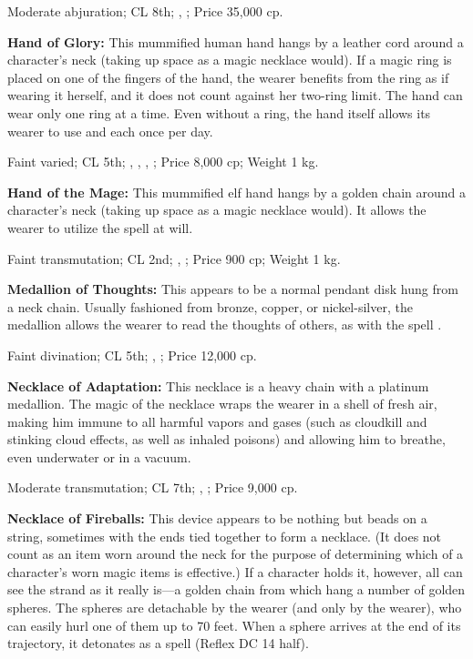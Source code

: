 Moderate abjuration; CL 8th; , ; Price 35,000 cp.


\textbf{Hand of Glory:} This mummified human hand hangs by a leather cord around a character's neck (taking up space as a magic necklace would). If a magic ring is placed on one of the fingers of the hand, the wearer benefits from the ring as if wearing it herself, and it does not count against her two-ring limit. The hand can wear only one ring at a time. Even without a ring, the hand itself allows its wearer to use  and  each once per day.

Faint varied; CL 5th; , , , ; Price 8,000 cp; Weight 1 kg.


\textbf{Hand of the Mage:} This mummified elf hand hangs by a golden chain around a character's neck (taking up space as a magic necklace would). It allows the wearer to utilize the spell  at will.

Faint transmutation; CL 2nd; , ; Price 900 cp; Weight 1 kg.


\textbf{Medallion of Thoughts:} This appears to be a normal pendant disk hung from a neck chain. Usually fashioned from bronze, copper, or nickel-silver, the medallion allows the wearer to read the thoughts of others, as with the spell .

Faint divination; CL 5th; , ; Price 12,000 cp.


\textbf{Necklace of Adaptation:} This necklace is a heavy chain with a platinum medallion. The magic of the necklace wraps the wearer in a shell of fresh air, making him immune to all harmful vapors and gases (such as cloudkill and stinking cloud effects, as well as inhaled poisons) and allowing him to breathe, even underwater or in a vacuum.

Moderate transmutation; CL 7th; , ; Price 9,000 cp.


\textbf{Necklace of Fireballs:} This device appears to be nothing but beads on a string, sometimes with the ends tied together to form a necklace. (It does not count as an item worn around the neck for the purpose of determining which of a character's worn magic items is effective.) If a character holds it, however, all can see the strand as it really is---a golden chain from which hang a number of golden spheres. The spheres are detachable by the wearer (and only by the wearer), who can easily hurl one of them up to 70 feet. When a sphere arrives at the end of its trajectory, it detonates as a  spell (Reflex DC 14 half).

